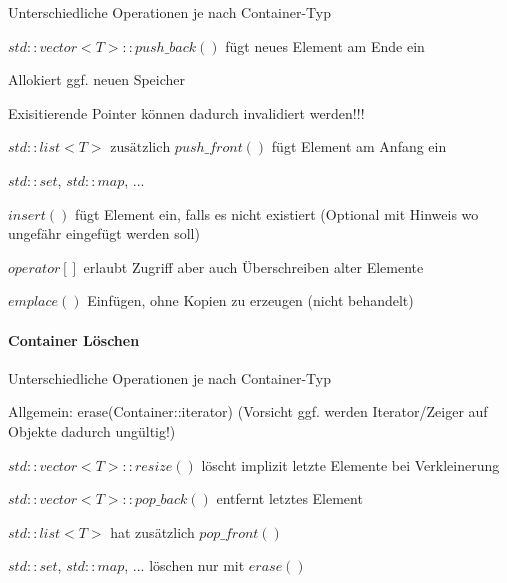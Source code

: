\documentclass[10pt]{article}
\begin{document}
\begin{itemize*}
  \item Unterschiedliche Operationen je nach Container-Typ
  \item $std::vector<T>::push\_back()$ fügt neues Element am Ende ein
  \begin{itemize*}
    \item Allokiert ggf. neuen Speicher
    \item Exisitierende Pointer können dadurch invalidiert werden!!!
  \end{itemize*}
  \item $std::list<T> \text{ zusätzlich } push\_front()$ fügt Element am Anfang ein
  \item $std::set$, $std::map$, ...
  \begin{itemize*}
    \item $insert()$ fügt Element ein, falls es nicht existiert (Optional mit Hinweis wo ungefähr eingefügt werden soll)
    \item $operator[]$ erlaubt Zugriff aber auch Überschreiben alter Elemente
    \item $emplace()$ Einfügen, ohne Kopien zu erzeugen (nicht behandelt)
  \end{itemize*}
\end{itemize*}

\paragraph{Container Löschen}

\begin{itemize*}
  \item Unterschiedliche Operationen je nach Container-Typ
  \item Allgemein: erase(Container::iterator) (Vorsicht ggf. werden Iterator/Zeiger auf Objekte dadurch ungültig!)
  \item $std::vector<T>::resize()$ löscht implizit letzte Elemente bei Verkleinerung
  \item $std::vector<T>::pop\_back()$ entfernt letztes Element
  \item $std::list<T>$ hat zusätzlich $pop\_front()$
  \item $std::set$, $std::map$, ... löschen nur mit $erase()$
\end{itemize*}
\end{document}
